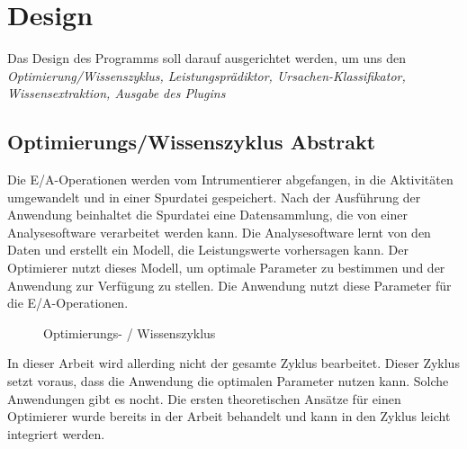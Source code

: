 
\newpage

\section{Design}
Das Design des Programms soll darauf ausgerichtet werden, um uns den 
\textit{Optimierung/Wissenszyklus, Leistungsprädiktor, Ursachen-Klassifikator, Wissensextraktion, Ausgabe des Plugins}

\subsection{Optimierungs/Wissenszyklus Abstrakt}

Die E/A-Operationen werden vom Intrumentierer abgefangen, in die Aktivitäten umgewandelt und in einer Spurdatei gespeichert.
Nach der Ausführung der Anwendung beinhaltet die Spurdatei eine Datensammlung, die von einer Analysesoftware verarbeitet werden kann.
Die Analysesoftware lernt von den Daten und erstellt ein Modell, die Leistungswerte vorhersagen kann.
Der Optimierer nutzt dieses Modell, um optimale Parameter zu bestimmen und der Anwendung zur Verfügung zu stellen.
Die Anwendung nutzt diese Parameter für die E/A-Operationen.


\begin{figure}[ht]
	\centering
	
	\label{fig:des:opt_cycle}
	\caption{Optimierungs- / Wissenszyklus}
\end{figure}

In dieser Arbeit wird allerding nicht der gesamte Zyklus bearbeitet.
Dieser Zyklus setzt voraus, dass die Anwendung die optimalen Parameter nutzen kann. 
Solche Anwendungen gibt es nocht.
Die ersten theoretischen Ansätze für einen Optimierer wurde bereits in der Arbeit  behandelt und kann in den Zyklus leicht integriert werden.

